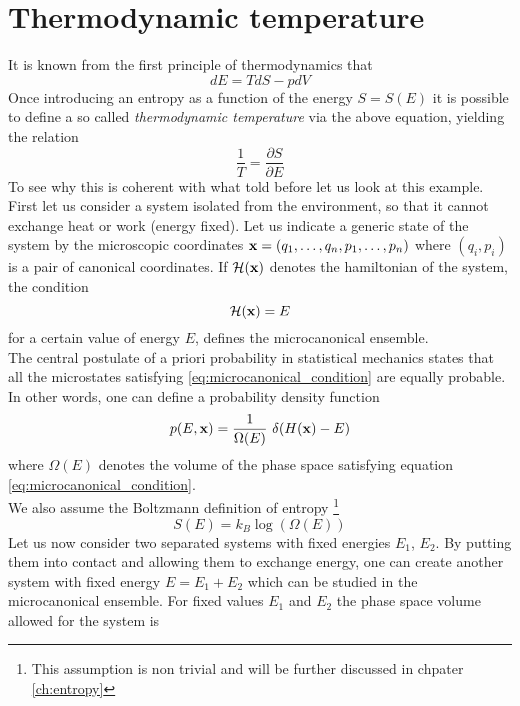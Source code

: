 \section{Thermodynamic temperature}
It is known from the first principle of thermodynamics that 
\begin{equation*}
    dE = TdS - pdV
\end{equation*}
Once introducing an entropy as a function of the energy $S = S(E)$ it is possible to define a so called \emph{thermodynamic temperature} via the above equation, yielding the relation $$\frac{1}{T} = \frac{\partial S}{\partial E}$$
To see why this is coherent with what told before let us look at this example. \\
First let us consider a system isolated from the environment, so that it cannot exchange heat or work (energy fixed). Let us indicate a generic
state of the system by the microscopic coordinates $\mathbf{x} = (q_1, \dots, q_n, p_1, \dots, p_n)$ where $(q_i, p_i)$ is a pair of canonical coordinates. If $\mathcal{H}(\mathbf{x})$ denotes the hamiltonian of the system,
the condition
\begin{equation}
    \mathcal{H}(\mathbf{x}) = E
    \label{eq:microcanonical_condition}
\end{equation}    
for a certain value of energy $E$, defines the microcanonical ensemble. \\
The central postulate of a priori probability in statistical mechanics states that all the microstates satisfying \ref{eq:microcanonical_condition} are equally probable. In other words, one can
define a probability density function
\begin{equation*}
    p(E, \mathbf{x}) = \frac{1}{\Omega(E)} \ \delta(H(\mathbf{x}) - E)
\end{equation*}
where $\Omega(E)$ denotes the volume of the phase space satisfying equation \ref{eq:microcanonical_condition}. \\
We also assume the Boltzmann definition of entropy \footnote{This assumption is non trivial and will be further discussed in chpater \ref{ch:entropy}}
\begin{equation}
    S(E) = k_B \log(\Omega(E))
    \label{eq:Boltzmann_entropy}
\end{equation}
Let us now consider two separated systems with fixed energies $E_1$, $E_2$. By putting them into contact and allowing them to exchange energy, one can create another system 
with fixed energy $E = E_1 + E_2$ which can be studied in the microcanonical ensemble.
For fixed values $E_1$ and $E_2$ the phase space volume allowed for the system is 
